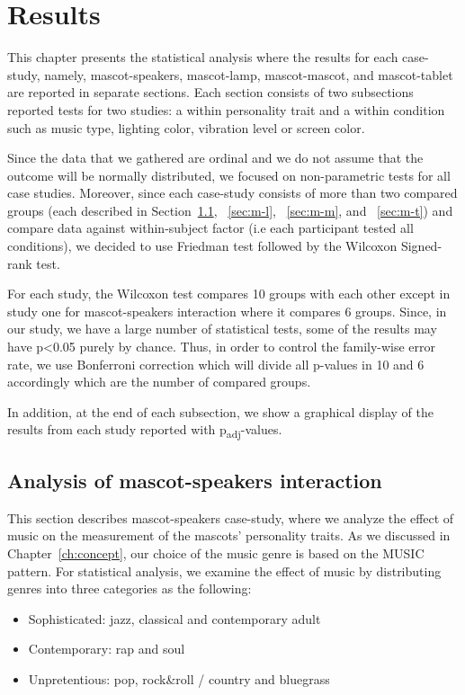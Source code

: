\chapter{Results}
\label{ch:results}
This chapter presents the statistical analysis where the results
for each case-study, namely, mascot-speakers, mascot-lamp, mascot-mascot, and
mascot-tablet are reported in separate sections.
Each section consists of two subsections reported tests for two
studies: a within personality trait and a within condition such as music type, lighting color,
vibration level or screen color.

Since the data that we gathered are ordinal and we do not assume that the outcome
will be normally distributed, we focused on non-parametric tests for all case studies.
Moreover, since each case-study consists of more than two compared groups
(each described in Section~\ref{sec:m-s}, ~\ref{sec:m-l}, ~\ref{sec:m-m}, and ~\ref{sec:m-t})
and compare data against within-subject factor (i.e each participant tested all conditions),
we decided to use Friedman test followed by the Wilcoxon Signed-rank test.

For each study, the Wilcoxon test compares 10 groups with each other except in
study one for mascot-speakers interaction where it compares 6 groups.
Since, in our study, we have a large number of statistical tests,
some of the results may have p<0.05 purely by chance.
Thus, in order to control the family-wise error rate, we use Bonferroni
correction which will divide all p-values in 10 and 6 accordingly which are the number of compared groups.

In addition, at the end of each subsection, we show a graphical display of the results from each study
reported with p\textsubscript{adj}-values.
\section{Analysis of mascot-speakers interaction}
\label{sec:m-s}
This section describes mascot-speakers case-study, where we analyze the effect of music
on the measurement of the mascots' personality traits.
As we discussed in Chapter~\ref{ch:concept}, our choice of the music genre is based on the MUSIC pattern.
For statistical analysis, we examine the effect of
music by distributing genres into three categories as the following:
\begin{itemize}
    \item Sophisticated: jazz, classical and contemporary adult
    \item Contemporary: rap and soul
    \item Unpretentious: pop, rock\&roll / country and bluegrass
\end{itemize}

